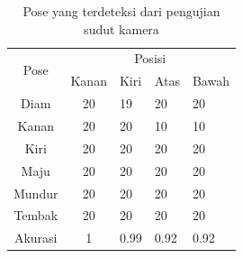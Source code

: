 \begin{table}[H]
  \centering
  \caption{Pose yang terdeteksi dari pengujian sudut kamera}
  \label{tab:hasilsudut}
  \begin{tabular}{|c|clll|}
    \hline
    \multirow{2}{*}{Pose} & \multicolumn{4}{c|}{Posisi} \\ \cline{2-5} 
      & \multicolumn{1}{l|}{Kanan} & \multicolumn{1}{l|}{Kiri} & \multicolumn{1}{l|}{Atas} & Bawah \\ \hline
    Diam                  & \multicolumn{1}{c|}{20}   & \multicolumn{1}{l|}{19}   & \multicolumn{1}{l|}{20}   &   20  \\ \hline
    Kanan                 & \multicolumn{1}{c|}{20}   & \multicolumn{1}{l|}{20}   & \multicolumn{1}{l|}{10}   &   10  \\ \hline
    Kiri                  & \multicolumn{1}{c|}{20}   & \multicolumn{1}{l|}{20}   & \multicolumn{1}{l|}{20}   &   20  \\ \hline
    Maju                  & \multicolumn{1}{c|}{20}   & \multicolumn{1}{l|}{20}   & \multicolumn{1}{l|}{20}   &   20  \\ \hline
    Mundur                & \multicolumn{1}{c|}{20}   & \multicolumn{1}{l|}{20}   & \multicolumn{1}{l|}{20}   &   20  \\ \hline
    Tembak                & \multicolumn{1}{c|}{20}   & \multicolumn{1}{l|}{20}   & \multicolumn{1}{l|}{20}   &   20  \\ \hline
    Akurasi                  & \multicolumn{1}{c|}{1}   & \multicolumn{1}{l|}{0.99}   & \multicolumn{1}{l|}{0.92}   &   0.92  \\ \hline
  \end{tabular}
\end{table}


